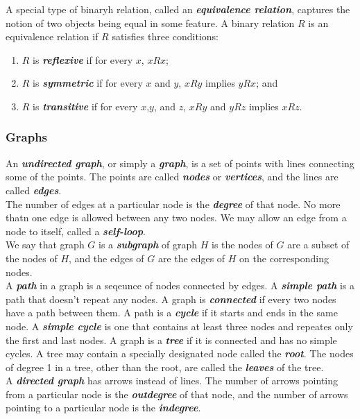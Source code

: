 \documentclass{article}
\theoremstyle{definition}
\newcommand{\define}[1]{\textbf{\textit{#1}}}
\begin{document}
A special type of binaryh relation, called an \define{equivalence relation}, captures the notion of two objects being equal in some feature. A binary relation $R$ is an equivalence relation if $R$ satisfies three conditions:

\begin{enumerate}
  \item $R$ is \define{reflexive} if for every $x$, $xRx$;
  \item $R$ is \define{symmetric} if for every $x$ and $y$, $xRy$ implies $yRx$; and 
  \item $R$ is \define{transitive} if for every $x$,$y$, and $z$, $xRy$ and $yRz$ implies $xRz$. 
\end{enumerate}

\subsubsection{Graphs}

An \define{undirected graph}, or simply a \define{graph}, is a set of points with lines connecting some of the points. The points are called \define{nodes} or \define{vertices}, and the lines are called \define{edges}. \\ 

The number of edges at a particular node is the \define{degree} of that node. No more thatn one edge is allowed between any two nodes. We may allow an edge from a node to itself, called a \define{self-loop}. \\ 

We say that graph $G$ is a \define{subgraph} of graph $H$ is the nodes of $G$ are a subset of the nodes of $H$, and the edges of $G$ are the edges of $H$ on the corresponding nodes. \\ 

A \define{path} in a graph is a seqeunce of nodes connected by edges. A \define{simple path} is a path that doesn't repeat any nodes. A graph is \define{connected} if every two nodes have a path between them. A path is a \define{cycle} if it starts and ends in the same node. A \define{simple cycle} is one that contains at least three nodes and repeates only the first and last nodes. A graph is a \define{tree} if it is connected and has no simple cycles. A tree may contain a specially designated node called the \define{root}. The nodes of degree 1 in a tree, other than the root, are called the \define{leaves} of the tree. \\ 

A \define{directed graph} has arrows instead of lines. The number of arrows pointing from a particular node is the \define{outdegree} of that node, and the number of arrows pointing to a particular node is the \define{indegree}. \\ 
\end{document}

